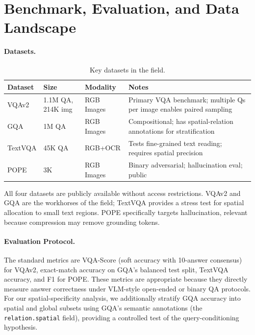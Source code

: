 \documentclass[11pt,twocolumn]{article}
\begin{document}
\section{Benchmark, Evaluation, and Data Landscape}
\label{sec:benchmarks}

\paragraph{Datasets.}

\begin{table}[h]
\caption{Key datasets in the field.}
\label{tab:datasets}
\vskip 0.1in
\begin{center}
\begin{small}
\begin{tabular}{p{1.5cm} p{1.2cm} p{1.3cm} p{2.2cm}}
\toprule
\textbf{Dataset} & \textbf{Size} & \textbf{Modality} 
& \textbf{Notes} \\
\midrule
VQAv2 & 1.1M QA, 214K img & RGB Images & Primary VQA benchmark; multiple Qs per image enables paired sampling \\
GQA & 1M QA & RGB Images & Compositional; has spatial-relation annotations for stratification \\
TextVQA & 45K QA & RGB+OCR & Tests fine-grained text reading; requires spatial precision \\
POPE & 3K & RGB Images & Binary adversarial; hallucination eval; public \\
\bottomrule
\end{tabular}
\end{small}
\end{center}
\end{table}

All four datasets are publicly available without access restrictions. VQAv2 and GQA are the workhorses of the field; TextVQA provides a stress test for spatial allocation to small text regions. POPE specifically targets hallucination, relevant because compression may remove grounding tokens.

\paragraph{Evaluation Protocol.}
The standard metrics are VQA-Score (soft accuracy with 10-answer consensus) for VQAv2, exact-match accuracy on GQA's balanced test split, TextVQA accuracy, and F1 for POPE. These metrics are appropriate because they directly measure answer correctness under VLM-style open-ended or binary QA protocols. For our spatial-specificity analysis, we additionally stratify GQA accuracy into spatial and global subsets using GQA's semantic annotations (the \texttt{relation.spatial} field), providing a controlled test of the query-conditioning hypothesis.
\end{document}
